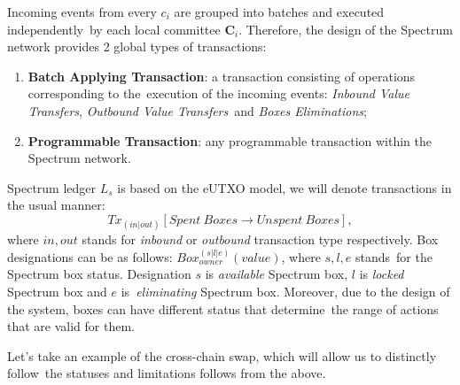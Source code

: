 Incoming events from every $c_i$ are grouped into batches and executed independently\
by each local committee $\mathbf{C}_i$.
Therefore, the design of the Spectrum network provides 2 global types of transactions:
\begin{enumerate}
    \item \textbf{Batch Applying Transaction}: a transaction consisting of operations corresponding to the\
    execution of the incoming events: \textit{Inbound Value Transfers}, \textit{Outbound Value Transfers}\
    and \textit{Boxes Eliminations};
    \item \textbf{Programmable Transaction}: any programmable transaction within the Spectrum network.
\end{enumerate}

Spectrum ledger $L_s$ is based on the eUTXO model, we will denote transactions in the usual manner:
\begin{equation}
{Tx_{(in | out)}[Spent\ Boxes \rightarrow Unspent \ Boxes]}
    ,
\end{equation}
where ${in, out}$ stands for \textit{inbound} or \textit{outbound} transaction type respectively.
Box designations can be as follows: ${Box_{owner}^{(s | l | e)}(value)}$, where ${s, l, e}$ stands\
for the Spectrum box status.
Designation $s$ is \textit{available} Spectrum box, $l$ is \textit{locked} Spectrum box and $e$ is\
\textit{eliminating} Spectrum box.
Moreover, due to the design of the system, boxes can have different status that determine\
the range of actions that are valid for them.

Let's take an example of the cross-chain swap, which will allow us to distinctly follow\
the statuses and limitations follows from the above.

